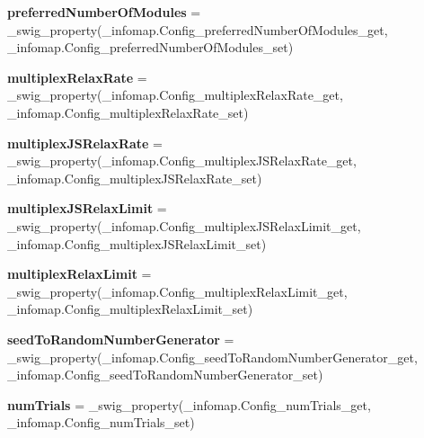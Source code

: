 \begin{DoxyCompactItemize}
{\bfseries preferred\+Number\+Of\+Modules} = \+\_\+swig\+\_\+property(\+\_\+infomap.\+Config\+\_\+preferred\+Number\+Of\+Modules\+\_\+get, \+\_\+infomap.\+Config\+\_\+preferred\+Number\+Of\+Modules\+\_\+set)
\item 
\mbox{\label{classinfomapfolder_1_1infomap_1_1Config_a0dd4c6d559fd0d5b50108e9db006adfc}} 
{\bfseries multiplex\+Relax\+Rate} = \+\_\+swig\+\_\+property(\+\_\+infomap.\+Config\+\_\+multiplex\+Relax\+Rate\+\_\+get, \+\_\+infomap.\+Config\+\_\+multiplex\+Relax\+Rate\+\_\+set)
\item 
\mbox{\label{classinfomapfolder_1_1infomap_1_1Config_aa8ff53fc9c1b72d6263d916292804887}} 
{\bfseries multiplex\+J\+S\+Relax\+Rate} = \+\_\+swig\+\_\+property(\+\_\+infomap.\+Config\+\_\+multiplex\+J\+S\+Relax\+Rate\+\_\+get, \+\_\+infomap.\+Config\+\_\+multiplex\+J\+S\+Relax\+Rate\+\_\+set)
\item 
\mbox{\label{classinfomapfolder_1_1infomap_1_1Config_ae45de5061b707fa3f7d23112d0a6c53e}} 
{\bfseries multiplex\+J\+S\+Relax\+Limit} = \+\_\+swig\+\_\+property(\+\_\+infomap.\+Config\+\_\+multiplex\+J\+S\+Relax\+Limit\+\_\+get, \+\_\+infomap.\+Config\+\_\+multiplex\+J\+S\+Relax\+Limit\+\_\+set)
\item 
\mbox{\label{classinfomapfolder_1_1infomap_1_1Config_ad5ac7ffb48574a84589afa2a2b6e6fcc}} 
{\bfseries multiplex\+Relax\+Limit} = \+\_\+swig\+\_\+property(\+\_\+infomap.\+Config\+\_\+multiplex\+Relax\+Limit\+\_\+get, \+\_\+infomap.\+Config\+\_\+multiplex\+Relax\+Limit\+\_\+set)
\item 
\mbox{\label{classinfomapfolder_1_1infomap_1_1Config_ad4469632f28248b2081e3da761899a6b}} 
{\bfseries seed\+To\+Random\+Number\+Generator} = \+\_\+swig\+\_\+property(\+\_\+infomap.\+Config\+\_\+seed\+To\+Random\+Number\+Generator\+\_\+get, \+\_\+infomap.\+Config\+\_\+seed\+To\+Random\+Number\+Generator\+\_\+set)
\item 
\mbox{\label{classinfomapfolder_1_1infomap_1_1Config_a70e2a5be39b70191331cd24d9406f074}} 
{\bfseries num\+Trials} = \+\_\+swig\+\_\+property(\+\_\+infomap.\+Config\+\_\+num\+Trials\+\_\+get, \+\_\+infomap.\+Config\+\_\+num\+Trials\+\_\+set)

\end{DoxyCompactItemize}
